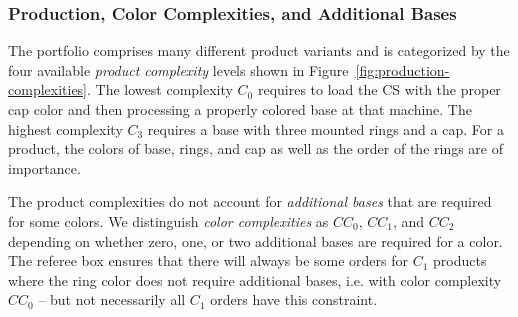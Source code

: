 \documentclass[12pt,twoside]{article}
\newcommand{\reffig}[1]{Figure~\ref{#1}}
\begin{document}
\subsubsection{Production, Color Complexities, and Additional Bases}
\label{sec:production-complexities}
The portfolio comprises many different product variants and is
categorized by the four available \emph{product complexity} levels
shown in \reffig{fig:production-complexities}. The lowest complexity
$C_0$ requires to load the CS with the proper cap color and then
processing a properly colored base at that machine. The highest
complexity $C_3$ requires a base with three mounted rings and a
cap. For a product, the colors of base, rings, and cap as well as the
order of the rings are of importance.

The product complexities do not account for \emph{additional bases}
that are required for some colors. We distinguish \emph{color
  complexities} as $CC_0$, $CC_1$, and $CC_2$ depending on whether
zero, one, or two additional bases are required for a color. The
referee box ensures that there will always be some orders for $C_1$
products where the ring color does not require additional bases,
i.e. with color complexity $CC_0$ -- but not necessarily all $C_1$
orders have this constraint.
\end{document}
